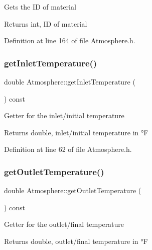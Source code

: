 Gets the ID of material \begin{DoxyReturn}{Returns}
int, ID of material 
\end{DoxyReturn}


Definition at line 164 of file Atmosphere.\+h.

\mbox{\label{class_atmosphere_acb944a3a99cd40f0132713ce73e6ca4a}} 
\subsubsection{\texorpdfstring{get\+Inlet\+Temperature()}{getInletTemperature()}}
{\footnotesize\ttfamily double Atmosphere\+::get\+Inlet\+Temperature (\begin{DoxyParamCaption}{ }\end{DoxyParamCaption}) const\hspace{0.3cm}{\ttfamily [inline]}}

Getter for the inlet/initial temperature \begin{DoxyReturn}{Returns}
double, inlet/initial temperature in °F 
\end{DoxyReturn}


Definition at line 62 of file Atmosphere.\+h.

\mbox{\label{class_atmosphere_a717e2dc78ebd13420f8f26707374dd3f}} 
\subsubsection{\texorpdfstring{get\+Outlet\+Temperature()}{getOutletTemperature()}}
{\footnotesize\ttfamily double Atmosphere\+::get\+Outlet\+Temperature (\begin{DoxyParamCaption}{ }\end{DoxyParamCaption}) const\hspace{0.3cm}{\ttfamily [inline]}}

Getter for the outlet/final temperature \begin{DoxyReturn}{Returns}
double, outlet/final temperature in °F 
\end{DoxyReturn}


